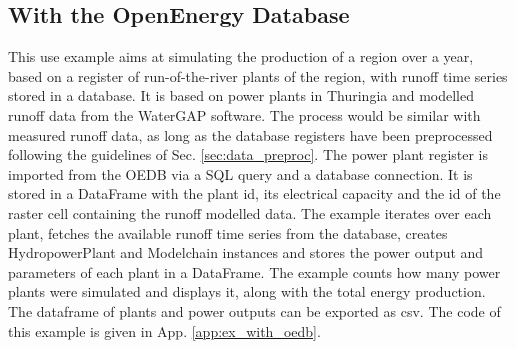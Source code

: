 \subsection{With the OpenEnergy Database}
\label{sub:ex_with_oedb}

This use example aims at simulating the production of a region over a year, based on a register of run-of-the-river plants of the region, with runoff time series stored in a database. It is based on power plants in Thuringia and modelled runoff data from the WaterGAP software. The process would be similar with measured runoff data, as long as the database registers have been preprocessed following the guidelines of Sec. \ref{sec:data_preproc}. \newline
The power plant register is imported from the OEDB via a SQL query and a database connection. It is stored in a DataFrame with the plant id, its electrical capacity and the id of the raster cell containing the runoff modelled data. The example iterates over each plant, fetches the available runoff time series from the database, creates HydropowerPlant and Modelchain instances and stores the power output and parameters of each plant in a DataFrame. \newline
The example counts how many power plants were simulated and displays it, along with the total energy production. The dataframe of plants and power outputs can be exported as csv. The code of this example is given in App. \ref{app:ex_with_oedb}.
